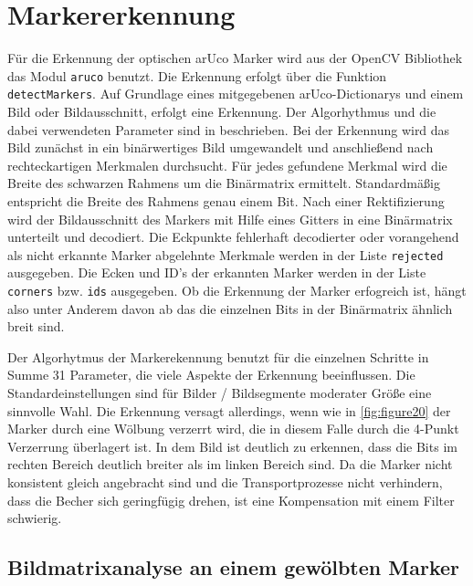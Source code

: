     \section {Markererkennung}

    Für die Erkennung der optischen arUco Marker wird aus der OpenCV Bibliothek das Modul \verb|aruco| benutzt. Die Erkennung erfolgt über die Funktion \verb|detectMarkers|.
    Auf Grundlage eines mitgegebenen arUco-Dictionarys und einem Bild oder Bildausschnitt, erfolgt eine Erkennung. 
    Der Algorhythmus und die dabei verwendeten Parameter sind in \cite{OpenCVaruco} beschrieben.
    Bei der Erkennung wird das Bild zunächst in ein binärwertiges Bild umgewandelt und anschließend nach rechteckartigen Merkmalen durchsucht. 
    Für jedes gefundene Merkmal wird die Breite des schwarzen Rahmens um die Binärmatrix ermittelt. 
    Standardmäßig entspricht die Breite des Rahmens genau einem Bit.
    Nach einer Rektifizierung wird der Bildausschnitt des Markers mit Hilfe eines Gitters in eine Binärmatrix unterteilt und decodiert. 
    Die Eckpunkte fehlerhaft decodierter oder vorangehend als nicht erkannte Marker abgelehnte Merkmale werden in der Liste \verb|rejected| ausgegeben.
    Die Ecken und ID's der erkannten Marker werden in der Liste \verb|corners| bzw. \verb|ids| ausgegeben.
    Ob die Erkennung der Marker erfogreich ist, hängt also unter Anderem davon ab das die einzelnen Bits in der Binärmatrix ähnlich breit sind. 
    
    Der Algorhytmus der Markerekennung benutzt für die einzelnen Schritte in Summe 31 Parameter, die viele Aspekte der Erkennung beeinflussen.
    Die Standardeinstellungen sind für Bilder / Bildsegmente moderater Größe eine sinnvolle Wahl. Die Erkennung versagt allerdings, wenn wie in 
    \ref{fig:figure20} der Marker durch eine Wölbung verzerrt wird, die in diesem Falle durch die 4-Punkt Verzerrung überlagert ist.
    In dem Bild ist deutlich zu erkennen, dass die Bits im rechten Bereich deutlich breiter als im linken Bereich sind. 
    Da die Marker nicht konsistent gleich angebracht sind und die Transportprozesse nicht verhindern, dass die Becher sich geringfügig drehen, ist eine Kompensation mit einem Filter 
    schwierig. 

    \subsection{Bildmatrixanalyse an einem gewölbten Marker}

